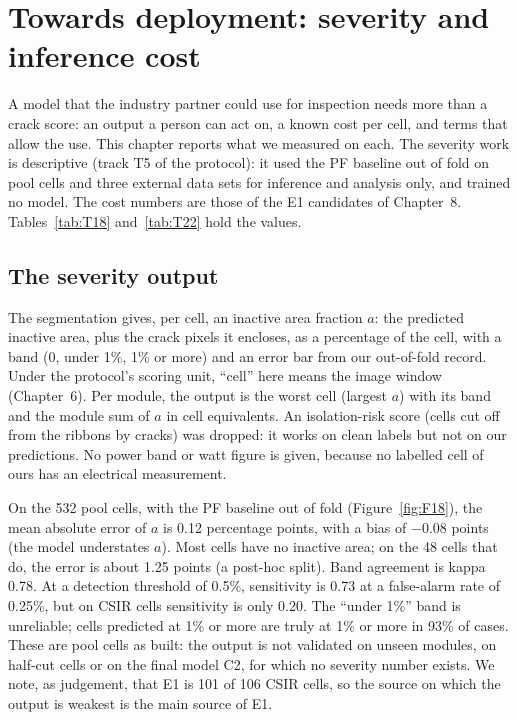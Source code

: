 
\chapter{Towards deployment: severity and inference cost}
\label{ch:deployment}

A model that the industry partner could use for inspection needs more than a crack score: an output a person can act on, a known cost per cell,
and terms that allow the use. This chapter reports what we measured on each. The severity work is descriptive (track T5 of the
protocol): it used the PF baseline out of fold on pool cells and three external data sets for inference and analysis only, and
trained no model. The cost numbers are those of the E1 candidates of Chapter~8. Tables~\ref{tab:T18} and~\ref{tab:T22} hold the
values.

\section{The severity output}
\label{sec:deploy-output}

The segmentation gives, per cell, an inactive area fraction $a$: the predicted inactive area, plus the crack pixels it encloses, as a
percentage of the cell, with a band (0, under 1\%, 1\% or more) and an error bar from our out-of-fold record. Under the protocol's
scoring unit, ``cell'' here means the image window (Chapter~6). Per module, the output is the worst cell (largest $a$) with its band and the module sum of $a$ in cell equivalents. An isolation-risk
score (cells cut off from the ribbons by cracks) was dropped: it works on clean labels but not on our predictions. No power band or
watt figure is given, because no labelled cell of ours has an electrical measurement.

On the 532 pool cells, with the PF baseline out of fold (Figure~\ref{fig:F18}), the mean absolute error of $a$ is 0.12 percentage points, with a bias of
$-$0.08 points (the model understates $a$). Most cells have no inactive area; on the 48 cells that do, the error is about 1.25 points
(a post-hoc split). Band agreement is kappa 0.78. At a detection threshold of 0.5\%, sensitivity is 0.73 at a false-alarm rate of
0.25\%, but on CSIR cells sensitivity is only 0.20. The ``under 1\%'' band is unreliable; cells predicted at 1\% or more are truly at
1\% or more in 93\% of cases. These are pool cells as built: the output is not validated on unseen modules, on half-cut cells or on
the final model C2, for which no severity number exists. We note, as judgement, that E1 is 101 of 106 CSIR cells, so the source on
which the output is weakest is the main source of E1.

